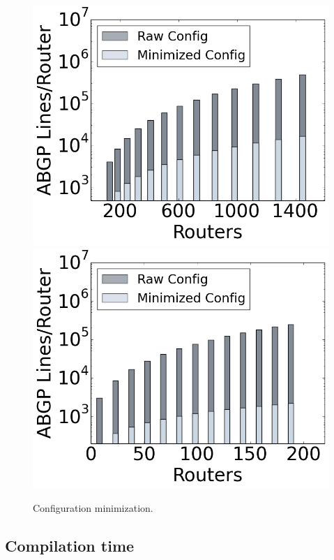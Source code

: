 \begin{figure}
    {\includegraphics[width=.49\columnwidth]{figures/config-compression-dc.png}}
    {\includegraphics[width=.49\columnwidth]{figures/config-compression-backbone.png}} \\
  \caption{Configuration minimization. \label{fig:config-min}}
  \vspace{-1em}
\end{figure}

\subsection{Compilation time}




